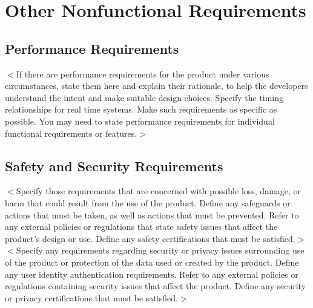 \documentclass[16pt]{scrreprt}
\begin{document}
%
%
%


\chapter{Other Nonfunctional Requirements}
\label{Other Nonfunctional Requirements}
\section{Performance Requirements}
$<$If there are performance requirements for the product under various 
circumstances, state them here and explain their rationale, to help the 
developers understand the intent and make suitable design choices. Specify the 
timing relationships for real time systems. Make such requirements as specific 
as possible. You may need to state performance requirements for individual 
functional requirements or features.$>$

\section{Safety and Security Requirements}
$<$Specify those requirements that are concerned with possible loss, damage, or 
harm that could result from the use of the product. Define any safeguards or 
actions that must be taken, as well as actions that must be prevented. Refer to 
any external policies or regulations that state safety issues that affect the 
product’s design or use. Define any safety certifications that must be 
satisfied.$>$
$<$Specify any requirements regarding security or privacy issues surrounding use 
of the product or protection of the data used or created by the product. Define 
any user identity authentication requirements. Refer to any external policies or 
regulations containing security issues that affect the product. Define any 
security or privacy certifications that must be satisfied.$>$
\end{document}
